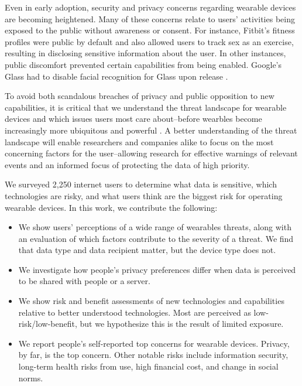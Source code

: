 \documentclass{acm_proc_article-sp}
\begin{document}
Even in early adoption, security and privacy concerns regarding wearable devices are becoming heightened. Many of these concerns relate to users' activities being exposed to the public without awareness or consent. For instance, Fitbit's fitness profiles were public by default and also allowed users to track sex as an exercise\cite{Fitbit}, resulting in disclosing sensitive information about the user. In other instances, public discomfort prevented certain capabilities from being enabled. Google's Glass had to disable facial recognition for Glass upon release \cite{GlassDetection}. 

To avoid both scandalous breaches of privacy and public opposition to new capabilities, it is critical that we understand the threat landscape for wearable devices and which issues users most care about--before wearbles become increasingly more ubiquitous and powerful \cite{Implants}. A better understanding of the threat landscape will enable researchers and companies alike to focus on the most concerning factors for the user--allowing research for effective warnings of relevant events and an informed focus of protecting the data of high priority.

We surveyed 2,250 internet users to determine what data is sensitive, which technologies are risky, and what users think are the biggest risk for operating wearable devices. In this work, we contribute the following: \\[-0.8cm]

\begin{itemize} \itemsep1pt \parskip0pt 
\item We show users' perceptions of a wide range of wearables threats, along with an evaluation of which factors contribute to the severity of a threat. We find that data type and data recipient matter, but the device type does not.  
\item We investigate how people's privacy preferences differ when data is perceived to be shared with people or a server.
\item We show risk and benefit assessments of new technologies and capabilities relative to better understood technologies.  Most are perceived as low-risk/low-benefit, but we hypothesize this is  the result of limited exposure. 
\item We report people's self-reported top concerns for wearable devices. Privacy, by far, is the top concern. Other notable risks include information security, long-term health risks from use, high financial cost, and change in social norms. 
\end{itemize}
\end{document}
